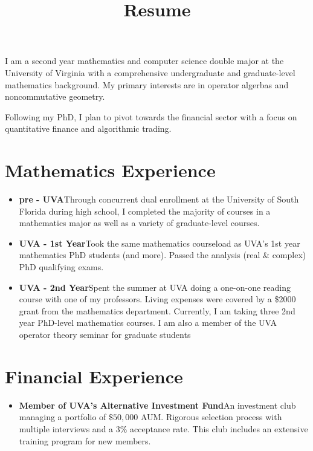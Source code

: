 \documentclass[12pt,letterpaper,sans]{moderncv}
\title{Resume}
\begin{document}
\makecvtitle %
\vspace*{-1.5em}


\begin{center}
  I am a second year mathematics and computer science double major at the University of Virginia with a comprehensive undergraduate and graduate-level mathematics background. My primary interests are in operator algerbas and noncommutative geometry.

\vspace{1.0em}
  Following my PhD, I plan to pivot towards the financial sector with a focus on quantitative finance and algorithmic trading.
\end{center}

\section{Mathematics Experience}

\begin{itemize}
  \item \textbf{pre - UVA}\quad Through concurrent dual enrollment at the University of South Florida during high school, I completed the majority of courses in a mathematics major as well as a variety of graduate-level courses.
  \item \textbf{UVA - 1st Year}\quad Took the same mathematics courseload as UVA's 1st year mathematics PhD students (and more). Passed the analysis (real \& complex) PhD qualifying exams.
  \item \textbf{UVA - 2nd Year}\quad Spent the summer at UVA doing a one-on-one reading course with one of my professors. Living expenses were covered by a \$2000 grant from the mathematics department. Currently, I am taking three 2nd year PhD-level mathematics courses. I am also a member of the UVA operator theory seminar for graduate students
\end{itemize}

\section{Financial Experience}
\begin{itemize}
  \item \textbf{Member of UVA's Alternative Investment Fund}\quad An investment club managing a portfolio of $ \$50,000 $ AUM. Rigorous selection process with multiple interviews and a $ 3\% $ acceptance rate. This club includes an extensive training program for new members. 
\end{itemize}
\end{document}
